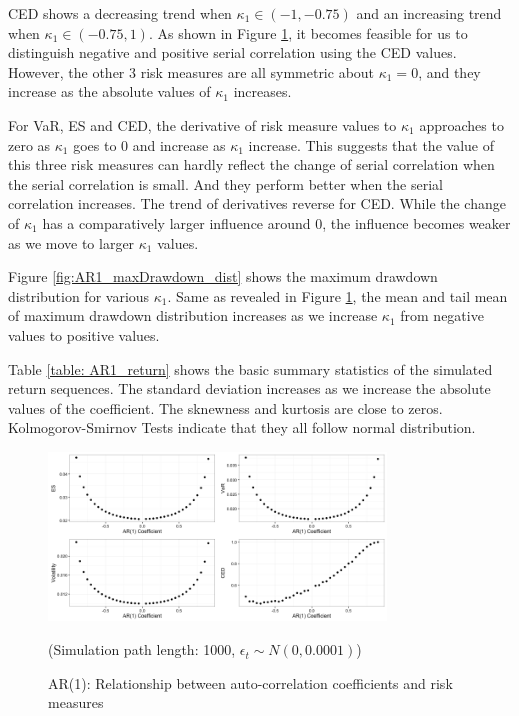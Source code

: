 \documentclass[11pt]{article}
\begin{document}
CED shows a decreasing trend when $\kappa_1\in(-1, -0.75)$ and an increasing trend when $\kappa_1 \in(-0.75, 1)$. As shown in Figure \ref{fig:AR1_risk_measures}, it becomes feasible for us to distinguish negative and positive serial correlation using the CED values. However, the other 3 risk measures are all symmetric about $\kappa_1 = 0$, and they increase as the absolute values of $\kappa_1$ increases.

For VaR, ES and CED, the derivative of risk measure values to $\kappa_1$ approaches to zero as  $\kappa_1$ goes to 0 and increase as $\kappa_1$ increase. This suggests that the value of this three risk measures can hardly reflect the change of serial correlation when the serial correlation is small. And they perform better when the serial correlation increases. The trend of derivatives reverse for CED. While the change of $\kappa_1$ has a comparatively larger influence around 0, the influence becomes weaker as we move to larger  $\kappa_1$ values.

Figure \ref{fig:AR1_maxDrawdown_dist} shows the maximum drawdown distribution for various $\kappa_1$. Same as revealed in Figure \ref{fig:AR1_risk_measures}, the mean and tail mean of maximum drawdown distribution increases as we increase $\kappa_1$ from negative values to positive values.

Table \ref{table: AR1_return} shows the basic summary statistics of the simulated return sequences. The standard deviation increases as we increase the absolute values of the coefficient. The sknewness and kurtosis are close to zeros. Kolmogorov-Smirnov Tests indicate that they all follow normal distribution. 

\begin{figure}[H]
\centering
\includegraphics[width = 0.8\textwidth]{../figures/simulation/AR1_risk_measures}
\caption{AR(1): Relationship between auto-correlation coefficients and risk measures}
(Simulation path length: 1000, $\epsilon_t \sim N(0, 0.0001)$)
\label{fig:AR1_risk_measures}
\end{figure}
\end{document}
